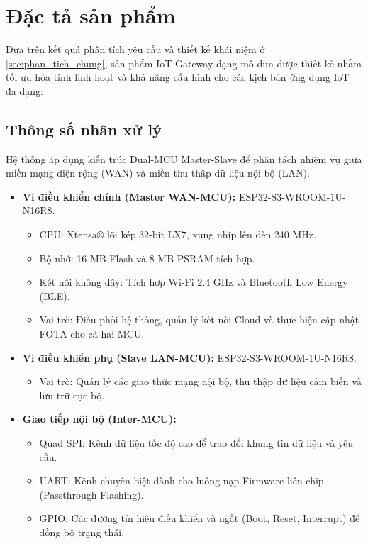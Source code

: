 \section{Đặc tả sản phẩm}

Dựa trên kết quả phân tích yêu cầu và thiết kế khái niệm ở \autoref{sec:phan_tich_chung}, sản phẩm IoT Gateway dạng mô-đun được thiết kế nhằm tối ưu hóa tính linh hoạt và khả năng cấu hình cho các kịch bản ứng dụng IoT đa dạng:

\subsection{Thông số nhân xử lý}
Hệ thống áp dụng kiến trúc Dual-MCU Master-Slave để phân tách nhiệm vụ giữa miền mạng diện rộng (WAN) và miền thu thập dữ liệu nội bộ (LAN).
\begin{itemize}
    \item \textbf{Vi điều khiển chính (Master WAN-MCU):} ESP32-S3-WROOM-1U-N16R8.
    \begin{itemize}
        \item CPU: Xtensa® lõi kép 32-bit LX7, xung nhịp lên đến 240 MHz.
        \item Bộ nhớ: 16 MB Flash và 8 MB PSRAM tích hợp.
        \item Kết nối không dây: Tích hợp Wi-Fi 2.4 GHz và Bluetooth Low Energy (BLE).
        \item Vai trò: Điều phối hệ thống, quản lý kết nối Cloud và thực hiện cập nhật FOTA cho cả hai MCU.
    \end{itemize}
    \item \textbf{Vi điều khiển phụ (Slave LAN-MCU):} ESP32-S3-WROOM-1U-N16R8.
    \begin{itemize}
        \item Vai trò: Quản lý các giao thức mạng nội bộ, thu thập dữ liệu cảm biến và lưu trữ cục bộ.
    \end{itemize}
    \item \textbf{Giao tiếp nội bộ (Inter-MCU):} 
    \begin{itemize}
        \item Quad SPI: Kênh dữ liệu tốc độ cao để trao đổi khung tin dữ liệu và yêu cầu.
        \item UART: Kênh chuyên biệt dành cho luồng nạp Firmware liên chip (Passthrough Flashing).
        \item GPIO: Các đường tín hiệu điều khiển và ngắt (Boot, Reset, Interrupt) để đồng bộ trạng thái.
    \end{itemize}
\end{itemize}

